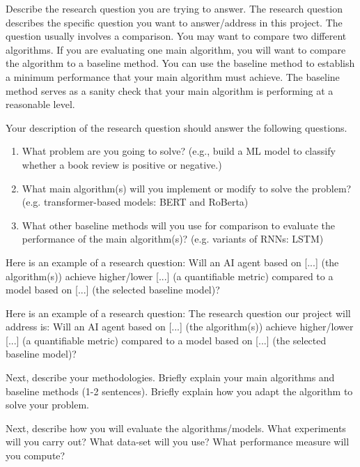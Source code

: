 \documentclass[letterpaper]{article} %
\begin{document}
Describe the research question you are trying to answer. The research question describes the specific question you want to answer/address in this project. The question usually involves a comparison. You may want to compare two different algorithms. If you are evaluating one main algorithm, you will want to compare the algorithm to a baseline method. You can use the baseline method to establish a minimum performance that your main algorithm must achieve. The baseline method serves as a sanity check that your main algorithm is performing at a reasonable level.

Your description of the research question should answer the following questions.
\begin{enumerate}
\item What problem are you going to solve? (e.g., build a ML model to classify whether a book review is positive or negative.)

\item What main algorithm(s) will you implement or modify to solve the problem? (e.g. transformer-based models: BERT and RoBerta)

\item What other baseline methods will you use for comparison to evaluate the performance of the main algorithm(s)? (e.g. variants of RNNs: LSTM)
\end{enumerate}
  
Here is an example of a research question: Will an AI agent based on [...] (the algorithm(s)) achieve higher/lower [...] (a quantifiable metric) compared to a model based on [...] (the selected baseline model)?
  
Here is an example of a research question: The research question our project will address is: Will an AI agent based on [...] (the algorithm(s)) achieve higher/lower [...] (a quantifiable metric) compared to a model based on [...] (the selected baseline model)?

Next, describe your methodologies. Briefly explain your main algorithms and baseline methods (1-2 sentences). Briefly explain how you adapt the algorithm to solve your problem.

Next, describe how you will evaluate the algorithms/models. What experiments will you carry out? What data-set will you use? What performance measure will you compute? 
\end{document}
